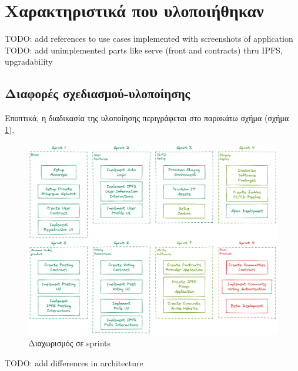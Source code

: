 \section{Χαρακτηριστικά που υλοποιήθηκαν} \label{section:4-6-implemented-parts}

TODO: add references to use cases implemented with screenshots of application
TODO: add unimplemented parts like serve (front and contracts) thru IPFS, upgradability

\subsection{Διαφορές σχεδιασμού-υλοποίησης} \label{subsection:4-6-1-design-implementation-differences}

Εποπτικά, η διαδικασία της υλοποίησης περιγράφεται στο παρακάτω σχήμα (σχήμα \ref{figure:4.6.design-implementation-differences-sprints}).

\begin{figure}[H]
    \centering
    \includegraphics[width=\textwidth]{assets/figures/chapter-4/4.6.design-implementation-differences-sprints.png}
    \caption{Διαχωρισμός σε sprints}
    \label{figure:4.6.design-implementation-differences-sprints}
\end{figure}

TODO: add differences in architecture
